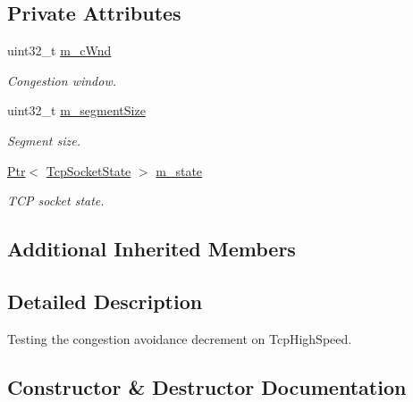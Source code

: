 \subsection*{Private Attributes}
\begin{DoxyCompactItemize}
\item 
uint32\+\_\+t \hyperlink{classTcpHighSpeedDecrementTest_aaf98ad76a6392e76f446aa8457dc501c}{m\+\_\+c\+Wnd}
\begin{DoxyCompactList}\small\item\em Congestion window. \end{DoxyCompactList}\item 
uint32\+\_\+t \hyperlink{classTcpHighSpeedDecrementTest_a433f5dc10ea2d739a6f628ee0bda1582}{m\+\_\+segment\+Size}
\begin{DoxyCompactList}\small\item\em Segment size. \end{DoxyCompactList}\item 
\hyperlink{classns3_1_1Ptr}{Ptr}$<$ \hyperlink{classns3_1_1TcpSocketState}{Tcp\+Socket\+State} $>$ \hyperlink{classTcpHighSpeedDecrementTest_ae055a8587feb7f7ae03383e7eb6938da}{m\+\_\+state}
\begin{DoxyCompactList}\small\item\em T\+CP socket state. \end{DoxyCompactList}\end{DoxyCompactItemize}
\subsection*{Additional Inherited Members}


\subsection{Detailed Description}
Testing the congestion avoidance decrement on Tcp\+High\+Speed. 

\subsection{Constructor \& Destructor Documentation}
